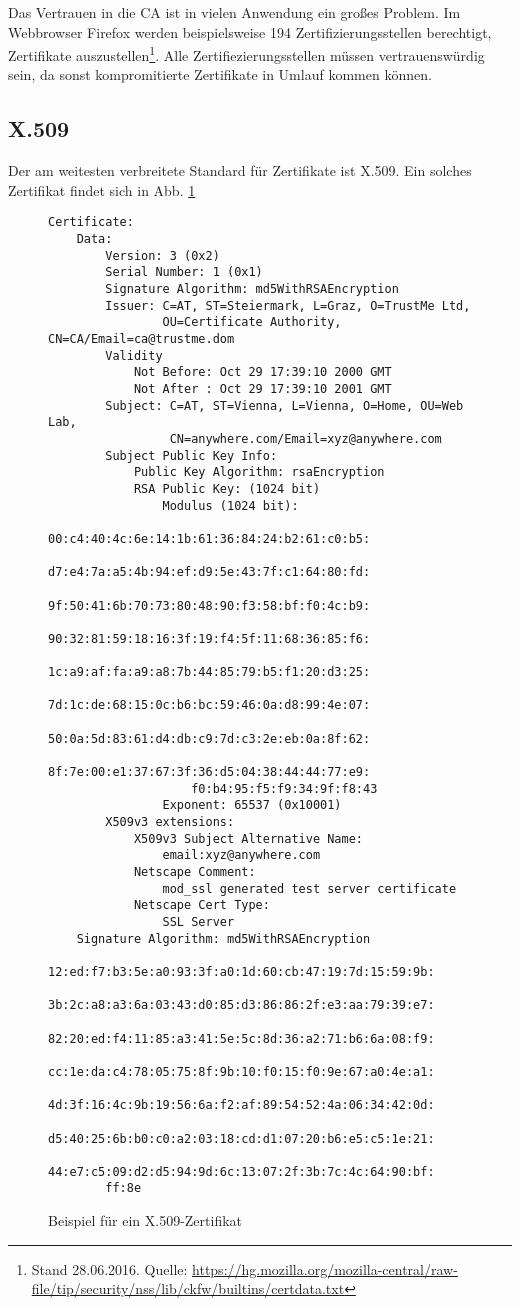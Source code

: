 Das Vertrauen in die CA ist in vielen Anwendung ein großes Problem. Im
Webbrowser Firefox werden beispielsweise 194 Zertifizierungsstellen
berechtigt, Zertifikate auszustellen\footnote{Stand 28.06.2016. Quelle:
  \url{https://hg.mozilla.org/mozilla-central/raw-file/tip/security/nss/lib/ckfw/builtins/certdata.txt}}. Alle
Zertifiezierungsstellen müssen vertrauenswürdig sein, da sonst
kompromitierte Zertifikate in Umlauf kommen können.

\subsection{X.509}
Der am weitesten verbreitete Standard für Zertifikate ist X.509. Ein
solches Zertifikat findet sich in Abb. \ref{fig:x509}
\begin{figure}
\begin{lstlisting}
Certificate:
    Data:
        Version: 3 (0x2)
        Serial Number: 1 (0x1)
        Signature Algorithm: md5WithRSAEncryption
        Issuer: C=AT, ST=Steiermark, L=Graz, O=TrustMe Ltd,
                OU=Certificate Authority, CN=CA/Email=ca@trustme.dom 
        Validity
            Not Before: Oct 29 17:39:10 2000 GMT
            Not After : Oct 29 17:39:10 2001 GMT
        Subject: C=AT, ST=Vienna, L=Vienna, O=Home, OU=Web Lab,
                 CN=anywhere.com/Email=xyz@anywhere.com 
        Subject Public Key Info:
            Public Key Algorithm: rsaEncryption
            RSA Public Key: (1024 bit)
                Modulus (1024 bit):
                    00:c4:40:4c:6e:14:1b:61:36:84:24:b2:61:c0:b5:
                    d7:e4:7a:a5:4b:94:ef:d9:5e:43:7f:c1:64:80:fd:
                    9f:50:41:6b:70:73:80:48:90:f3:58:bf:f0:4c:b9:
                    90:32:81:59:18:16:3f:19:f4:5f:11:68:36:85:f6:
                    1c:a9:af:fa:a9:a8:7b:44:85:79:b5:f1:20:d3:25:
                    7d:1c:de:68:15:0c:b6:bc:59:46:0a:d8:99:4e:07:
                    50:0a:5d:83:61:d4:db:c9:7d:c3:2e:eb:0a:8f:62:
                    8f:7e:00:e1:37:67:3f:36:d5:04:38:44:44:77:e9:
                    f0:b4:95:f5:f9:34:9f:f8:43
                Exponent: 65537 (0x10001)
        X509v3 extensions:
            X509v3 Subject Alternative Name:
                email:xyz@anywhere.com
            Netscape Comment:
                mod_ssl generated test server certificate
            Netscape Cert Type:
                SSL Server
    Signature Algorithm: md5WithRSAEncryption
        12:ed:f7:b3:5e:a0:93:3f:a0:1d:60:cb:47:19:7d:15:59:9b:
        3b:2c:a8:a3:6a:03:43:d0:85:d3:86:86:2f:e3:aa:79:39:e7:
        82:20:ed:f4:11:85:a3:41:5e:5c:8d:36:a2:71:b6:6a:08:f9:
        cc:1e:da:c4:78:05:75:8f:9b:10:f0:15:f0:9e:67:a0:4e:a1:
        4d:3f:16:4c:9b:19:56:6a:f2:af:89:54:52:4a:06:34:42:0d:
        d5:40:25:6b:b0:c0:a2:03:18:cd:d1:07:20:b6:e5:c5:1e:21:
        44:e7:c5:09:d2:d5:94:9d:6c:13:07:2f:3b:7c:4c:64:90:bf:
        ff:8e
\end{lstlisting}
\caption{Beispiel für ein X.509-Zertifikat}
\label{fig:x509}
\end{figure}

